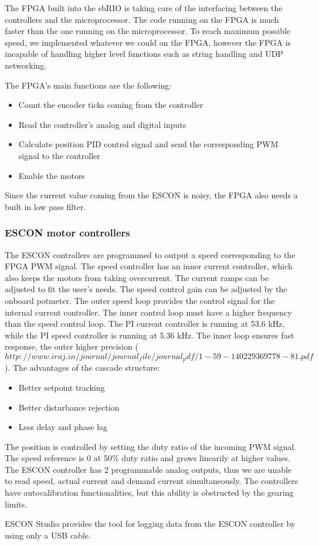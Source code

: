 The FPGA built into the sbRIO is taking care of the interfacing between the controllers and the microprocessor. The code running on the FPGA is much faster than the one running on the microprocessor. To reach maximum possible speed, we implemented whatever we could on the FPGA, however the FPGA is incapable of handling higher level functions such as string handling and UDP networking.

The FPGA's main functions are the following:

\begin{itemize}	
	\setlength\itemsep{0em}
	\item Count the encoder ticks coming from the controller
	\item Read the controller's analog and digital inputs 
	\item Calculate position PID control signal and send the corresponding PWM signal to the controller
	\item Enable the motors
	
\end{itemize}

Since the current value coming from the ESCON is noisy, the FPGA also needs a built in low pass filter.

\subsubsection{ESCON motor controllers}

The ESCON controllers are programmed to output a speed corresponding to the FPGA PWM signal. The speed controller has an inner current controller, which also keeps the motors from taking overcurrent. The current ramps can be adjusted to fit the user's needs. The speed control gain can be adjusted by the onboard potmeter. 
The outer speed loop provides the control signal for the internal current controller. The inner control loop must have a higher frequency than the speed control loop. The PI current controller is running at 53.6 kHz, while the PI speed controller is running at 5.36 kHz. The inner loop ensures fast response, the outer higher precision ($http://www.iraj.in/journal/journal_file/journal_pdf/1-59-140229369778-81.pdf$). The advantages of the cascade structure:

\begin{itemize}
	\item Better setpoint tracking
	\item Better disturbance rejection
	\item Less delay and phase lag
\end{itemize}

The position is controlled by setting the duty ratio of the incoming PWM signal. The speed reference is 0 at 50\% duty ratio and grows linearily at higher values.
The ESCON controller has 2 programmable analog outputs, thus we are unable to read speed, actual current and demand current simultaneously.
The controllers have autocalibration functionalities, but this ability is obstructed by the gearing limits.

ESCON Studio provides the tool for logging data from the ESCON controller by using only a USB cable.